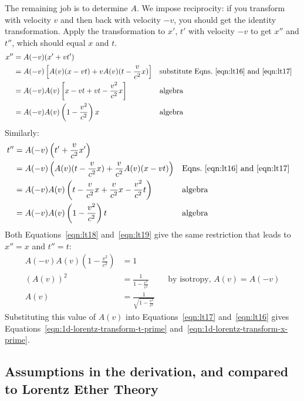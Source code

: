 \documentclass[a4paper]{article}
\theoremstyle{plain}
\theoremstyle{definition}
\begin{document}
The remaining job is to determine $A$.
We impose reciprocity: if you transform with velocity $v$
and then back with velocity $-v$, you should get the identity transformation.
Apply the transformation to $x'$, $t'$ with velocity $-v$ to
get $x''$ and $t''$, which should equal $x$ and $t$.
\begin{align}
x''
  & = A(-v) (x' + vt') \nonumber \\
  & = A(-v) \left[ A(v) (x-vt) + v A(v) (t - \frac{v}{c^2}x) \right] & & \text{substitute Eqns.~\eqref{eqn:lt16} and~\eqref{eqn:lt17}} \nonumber \\
  & = A(-v) A(v) \left[ x - vt + vt - \frac{v^2}{c^2}x \right] & & \text{algebra} \nonumber \\
  & = A(-v) A(v) \left( 1 - \frac{v^2}{c^2} \right) x & & \text{algebra} \label{eqn:lt18}
\end{align}
Similarly:
\begin{align}
t''
  & = A(-v) \left( t' + \frac{v}{c^2} x' \right) \nonumber \\
  & = A(-v) \left( A(v) (t - \frac{v}{c^2}x) + \frac{v}{c^2} A(v) (x-vt) \right) & & \text{Eqns.~\eqref{eqn:lt16} and~\eqref{eqn:lt17}} \nonumber \\
  & = A(-v) A(v) \left( t - \frac{v}{c^2}x + \frac{v}{c^2} x - \frac{v^2}{c^2} t \right) & & \text{algebra} \nonumber \\
  & = A(-v) A(v) \left( 1 - \frac{v^2}{c^2} \right) t & & \text{algebra} \label{eqn:lt19}
\end{align}
Both Equations~\eqref{eqn:lt18} and~\eqref{eqn:lt19}
give the same restriction that leads to $x''=x$ and $t''=t$:
\begin{align}
A(-v) A(v) \left( 1 - \frac{v^2}{c^2} \right) & = 1 \nonumber \\
(A(v))^2 & = \frac{1}{1 - \frac{v^2}{c^2}} \nonumber & & \text{by isotropy, $A(v)=A(-v)$} \\
A(v) & = \frac{1}{\sqrt{1 - \frac{v^2}{c^2}}} \nonumber
\end{align}
Substituting this value of $A(v)$ into Equations~\eqref{eqn:lt17}
and~\eqref{eqn:lt16} gives
Equations~\eqref{eqn:1d-lorentz-transform-t-prime}
and~\eqref{eqn:1d-lorentz-transform-x-prime}.


\subsection{Assumptions in the derivation, and compared to Lorentz Ether Theory}
\label{app:sr-assumptions-vs-lorentz-ether-theory}
\end{document}
